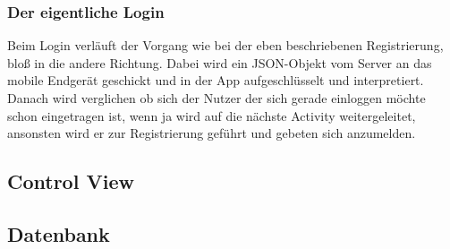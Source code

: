 \subsubsection{Der eigentliche Login}
Beim Login verläuft der Vorgang wie bei der eben beschriebenen Registrierung, bloß in die andere Richtung. Dabei wird ein JSON-Objekt vom Server an das mobile Endgerät geschickt und in der App aufgeschlüsselt und interpretiert. Danach wird verglichen ob sich der Nutzer der sich gerade einloggen möchte schon eingetragen ist, wenn ja wird auf die nächste Activity weitergeleitet, ansonsten wird er zur Registrierung geführt und gebeten sich anzumelden.
\subsection{Control View}
\subsection{Datenbank}